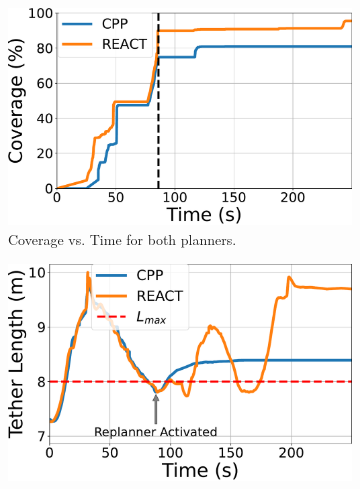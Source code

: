 \begin{table}[t]
    \centering
    \caption{Coverage Performance in Real-world Trials}
    \label{tab:realworld_coverage}
    \vspace{0.5em}
\end{table}



\begin{figure}[t]
    \centering
    \begin{subfigure}[b]{0.48\linewidth}
        \centering
        \includegraphics[width=\linewidth]{EA-Planner/figures/dfki_coverage_comparison_plot.pdf}
        \caption{ Coverage vs. Time for both planners.}
        \label{fig:traj_noreact}
    \end{subfigure}
    \hfill
    \begin{subfigure}[b]{0.48\linewidth}
        \centering
        \includegraphics[width=\linewidth]{EA-Planner/figures/dfki_tether_length_vs_time.pdf}

\end{subfigure}
\end{figure}
